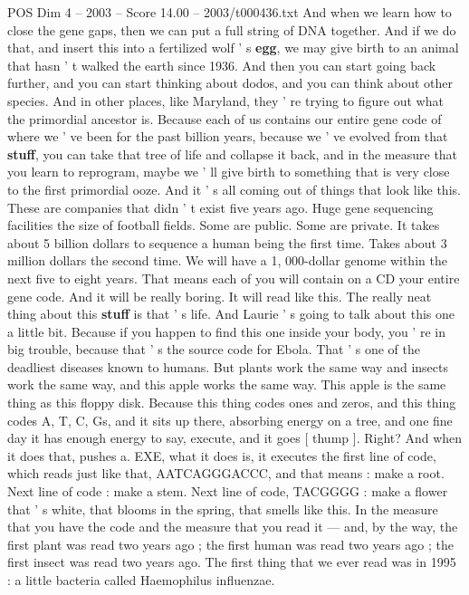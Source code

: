 \begin{textsample}{POS Dim 4 – 2003 – Score 14.00 – 2003/t000436.txt}
And when we learn how to close the gene gaps, then we can put a full string of DNA together.
And if we do that, and insert this into a fertilized wolf ' s \textbf{egg}, we may give birth to an animal that hasn ' t walked the earth since 1936.
And then you can start going back further, and you can start thinking about dodos, and you can think about other species.
And in other places, like Maryland, they ' re trying to figure out what the primordial ancestor is.
Because each of us contains our entire gene code of where we ' ve been for the past billion years, because we ' ve evolved from that \textbf{stuff}, you can take that tree of life and collapse it back, and in the measure that you learn to reprogram, maybe we ' ll give birth to something that is very close to the first primordial ooze.
And it ' s all coming out of things that look like this.
These are companies that didn ' t exist five years ago.
Huge gene sequencing facilities the size of football fields.
Some are public.
Some are private.
It takes about 5 billion dollars to sequence a human being the first time.
Takes about 3 million dollars the second time.
We will have a 1, 000-dollar genome within the next five to eight years.
That means each of you will contain on a CD your entire gene code.
And it will be really boring.
It will read like this.
The really neat thing about this \textbf{stuff} is that ' s life.
And Laurie ' s going to talk about this one a little bit.
Because if you happen to find this one inside your body, you ' re in big trouble, because that ' s the source code for Ebola.
That ' s one of the deadliest diseases known to humans.
But plants work the same way and insects work the same way, and this apple works the same way.
This apple is the same thing as this floppy disk.
Because this thing codes ones and zeros, and this thing codes A, T, C, Gs, and it sits up there, absorbing energy on a tree, and one fine day it has enough energy to say, execute, and it goes [ thump ].
Right?
And when it does that, pushes a.
EXE, what it does is, it executes the first line of code, which reads just like that, AATCAGGGACCC, and that means : make a root.
Next line of code : make a stem.
Next line of code, TACGGGG : make a flower that ' s white, that blooms in the spring, that smells like this.
In the measure that you have the code and the measure that you read it — and, by the way, the first plant was read two years ago ; the first human was read two years ago ; the first insect was read two years ago.
The first thing that we ever read was in 1995 : a little bacteria called Haemophilus influenzae.

\end{textsample}

